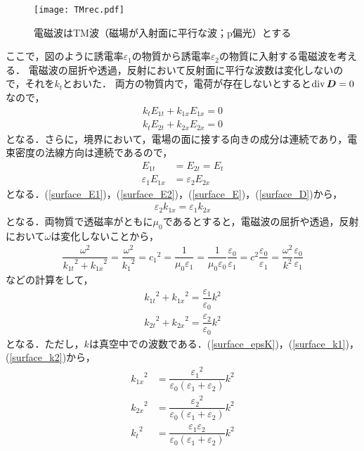\begin{figure}[ht]
  \centering
  \texttt{[image: TMrec.pdf]}
  \caption{電磁波はTM波（磁場が入射面に平行な波；p偏光）とする}
  \label{TMrec}
\end{figure}

ここで，図のように誘電率$\varepsilon_1$の物質から誘電率$\varepsilon_2$の物質に入射する電磁波を考える．
電磁波の屈折や透過，反射において反射面に平行な波数は変化しないので，それを$k_t$とおいた．
両方の物質内で，電荷が存在しないとすると$\operatorname{div}\boldsymbol{D}=0$なので，
\begin{align}
  k_tE_{1t}+k_{1x}E_{1x}=0\label{surface_E1} \\
  k_tE_{2t}+k_{2x}E_{2x}=0\label{surface_E2}
\end{align}
となる．さらに，境界において，電場の面に接する向きの成分は連続であり，電束密度の法線方向は連続であるので，
\begin{align}
  E_{1t}&=E_{2t}=E_t\label{surface_E} \\
  \varepsilon_1E_{1x}&=\varepsilon_2E_{2x}\label{surface_D}
\end{align}
となる．(\ref{surface_E1})，(\ref{surface_E2})，(\ref{surface_E})，(\ref{surface_D})から，
\begin{align}
  \varepsilon_2k_{1x}=\varepsilon_1k_{2x}\label{surface_epsK}
\end{align}
となる．両物質で透磁率がともに$\mu_0$であるとすると，電磁波の屈折や透過，反射において$\omega$は変化しないことから，
\begin{align*}
  \dfrac{\omega^2}{{k_{1t}}^2+{k_{1x}}^2}=\dfrac{\omega^2}{{k_1}^2}={c_1}^2=\dfrac{1}{\mu_0\varepsilon_1}=\dfrac{1}{\mu_0\varepsilon_0}\dfrac{\varepsilon_0}{\varepsilon_1}
  =c^2\dfrac{\varepsilon_0}{\varepsilon_1}=\dfrac{\omega^2}{{k}^2}\dfrac{\varepsilon_0}{\varepsilon_1}
\end{align*}
などの計算をして，
\begin{align}
  {k_{1t}}^2+{k_{1x}}^2=\dfrac{\varepsilon_1}{\varepsilon_0}k^2\label{surface_k1} \\
  {k_{2t}}^2+{k_{2x}}^2=\dfrac{\varepsilon_2}{\varepsilon_0}k^2\label{surface_k2}
\end{align}
となる．ただし，$k$は真空中での波数である．(\ref{surface_epsK})，(\ref{surface_k1})，(\ref{surface_k2})から，
\begin{align}
  {k_{1x}}^2&=\dfrac{{\varepsilon_1}^2}{\varepsilon_0(\varepsilon_1+\varepsilon_2)}k^2\label{surface_k1x}\\
  {k_{2x}}^2&=\dfrac{{\varepsilon_2}^2}{\varepsilon_0(\varepsilon_1+\varepsilon_2)}k^2\label{surface_k2x}\\
  {k_{t}}^2&=\dfrac{\varepsilon_1\varepsilon_2}{\varepsilon_0(\varepsilon_1+\varepsilon_2)}k^2\label{surface_kt}\\
\end{align}
